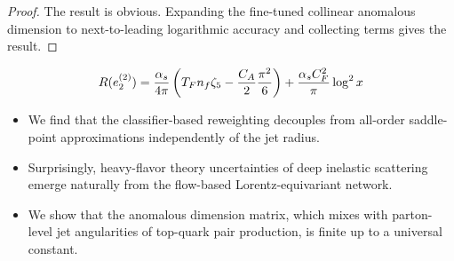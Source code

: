 \begin{proof}
The result is obvious. Expanding the fine-tuned collinear anomalous
dimension to next-to-leading logarithmic accuracy and collecting terms
gives the result.
\end{proof}

\begin{equation}
  R(e_2^{(2)}) = \frac{\alpha_s}{4\pi} \left( T_F n_f \zeta_{5} - \frac{C_A}{2} \frac{\pi^2}{6} \right) + \frac{\alpha_s C_F^2}{\pi} \log^2 x
  \label{eq:5}
\end{equation}

\begin{itemize}
  \item We find that the classifier-based reweighting decouples from all-order saddle-point approximations independently of the jet radius.
  \item Surprisingly, heavy-flavor theory uncertainties of deep inelastic scattering emerge naturally from the flow-based Lorentz-equivariant network.
  \item We show that the anomalous dimension matrix, which mixes with parton-level jet angularities of top-quark pair production, is finite up to a universal constant.
\end{itemize}

